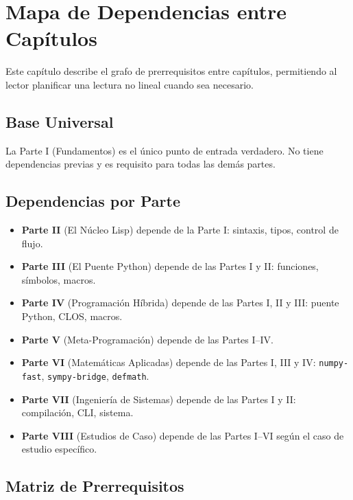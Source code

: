 \chapter{Mapa de Dependencias entre Capítulos}
\label{chap:deps}

Este capítulo describe el grafo de prerrequisitos entre capítulos,
permitiendo al lector planificar una lectura no lineal cuando sea necesario.

\section{Base Universal}

La Parte I (Fundamentos) es el único punto de entrada verdadero. No tiene
dependencias previas y es requisito para todas las demás partes.

\section{Dependencias por Parte}

\begin{itemize}
\item \textbf{Parte II} (El Núcleo Lisp) depende de la Parte I: sintaxis,
  tipos, control de flujo.
\item \textbf{Parte III} (El Puente Python) depende de las Partes I y II:
  funciones, símbolos, macros.
\item \textbf{Parte IV} (Programación Híbrida) depende de las Partes I, II y
  III: puente Python, CLOS, macros.
\item \textbf{Parte V} (Meta-Programación) depende de las Partes I--IV.
\item \textbf{Parte VI} (Matemáticas Aplicadas) depende de las Partes I, III
  y IV: \texttt{numpy-fast}, \texttt{sympy-bridge}, \texttt{defmath}.
\item \textbf{Parte VII} (Ingeniería de Sistemas) depende de las Partes I y
  II: compilación, CLI, sistema.
\item \textbf{Parte VIII} (Estudios de Caso) depende de las Partes I--VI
  según el caso de estudio específico.
\end{itemize}

\section{Matriz de Prerrequisitos}

